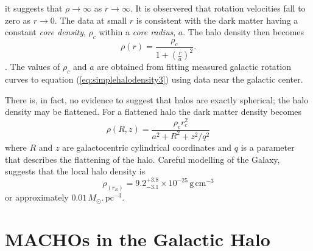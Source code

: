 it suggests that $\rho \rightarrow \infty$ as $r \rightarrow \infty$. It is
observered that rotation velocities fall to zero as $r\rightarrow 0$. The data
at small $r$ is consistent with the dark matter having a constant \emph{core
density}, $\rho_c$ within a \emph{core radius}, $a$. The halo density then
becomes
\begin{equation}
\rho(r) = \frac{\rho_c}{1 + \left(\frac{r}{a}\right)^2}.
\label{eq:simplehalodensity3}
\end{equation}.
The values of $\rho_c$ and $a$ are obtained from fitting measured galactic
rotation curves to equation (\ref{eq:simplehalodensity3}) using data near the
galactic center. 

There is, in fact, no evidence to suggest that halos are
exactly spherical; the halo density may be flattened\cite{Rix:1996}. For a
flattened halo the dark matter density becomes
\begin{equation}
\rho(R,z) = \frac{\rho_c r^2_c}{a^2 + R^2 + z^2/q^2}
\label{eq:simplehalodensity4}
\end{equation}
where $R$ and $z$ are galactocentric cylindrical coordinates and $q$ is a
parameter that describes the flattening of the halo. Careful modelling of the
Galaxy\cite{1995ApJ...449L.123G}, suggests that the local halo density is
\begin{equation}
\rho_(r_E) = 9.2_{-3.1}^{+3.8} \times 10^{-25}\, \mathrm{g}\,\mathrm{cm}^{-3}
\end{equation}
or approximately $0.01\,M_\odot.\,\mathrm{pc}^{-3}$.

\section{MACHOs in the Galactic Halo}
\label{s:machos}


